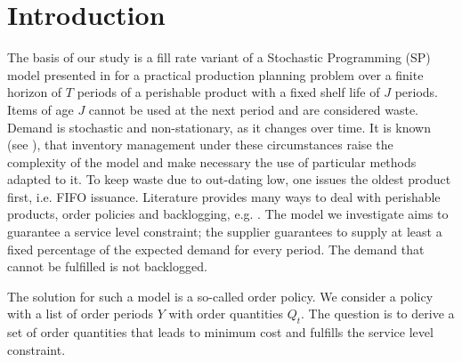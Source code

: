 %
%

%
%

\section{Introduction}\label{sec:intro}
The basis of our study is a fill rate variant of a Stochastic Programming (SP) model presented in \cite{PAULS14} for a practical production planning problem over a finite horizon of $T$ periods of a perishable product with a fixed shelf life of $J$ periods. Items of age $J$ cannot be used at the next period and are considered waste. Demand is stochastic and non-stationary, as it changes over time. It is known (see \cite{kurawarwala96}), that inventory management under these circumstances raise the complexity of the model and make necessary the use of particular methods adapted to it.
To keep waste due to out-dating low, one issues the oldest product first, i.e. FIFO issuance. Literature provides many ways to deal with perishable products, order policies and backlogging, e.g. \cite{hedjar2004,Silver98}. The model we investigate aims to guarantee a service level constraint; the supplier guarantees to supply at least a fixed percentage of  the expected demand for every period. The demand that cannot be fulfilled is not backlogged.

The solution for such a model is a so-called order policy.
We consider a policy with a list of order periods $Y$ with order quantities  $Q_t$. The question is to derive a set of order quantities that leads to minimum cost and fulfills the service level constraint.


